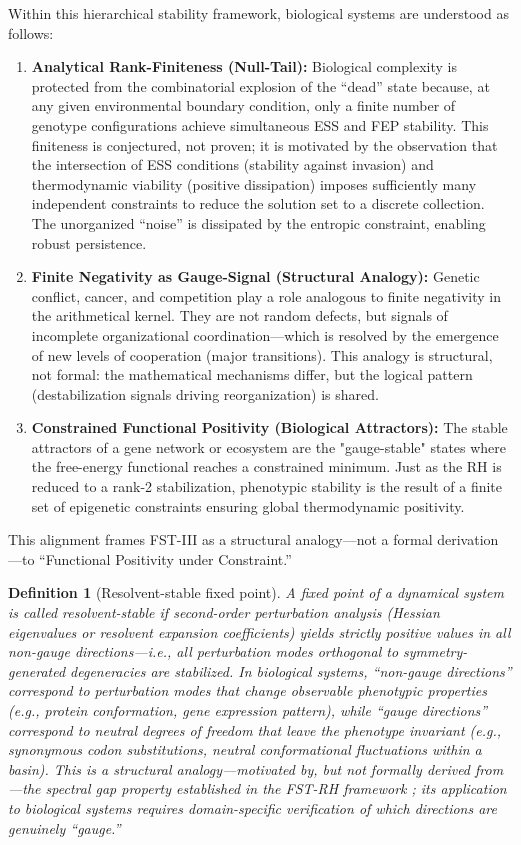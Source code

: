 \documentclass[12pt,a4paper]{article}
\newtheorem{definition}{Definition}
\theoremstyle{remark}
\begin{document}
Within this hierarchical stability framework, biological systems are understood as follows:
\begin{enumerate}[label=\alph*)]
    \item \textbf{Analytical Rank-Finiteness (Null-Tail):} Biological complexity is protected from the combinatorial explosion of the ``dead'' state because, at any given environmental boundary condition, only a finite number of genotype configurations achieve simultaneous ESS and FEP stability. This finiteness is conjectured, not proven; it is motivated by the observation that the intersection of ESS conditions (stability against invasion) and thermodynamic viability (positive dissipation) imposes sufficiently many independent constraints to reduce the solution set to a discrete collection. The unorganized ``noise'' is dissipated by the entropic constraint, enabling robust persistence.
    \item \textbf{Finite Negativity as Gauge-Signal (Structural Analogy):} Genetic conflict, cancer, and competition play a role analogous to finite negativity in the arithmetical kernel. They are not random defects, but signals of incomplete organizational coordination---which is resolved by the emergence of new levels of cooperation (major transitions). This analogy is structural, not formal: the mathematical mechanisms differ, but the logical pattern (destabilization signals driving reorganization) is shared.
    \item \textbf{Constrained Functional Positivity (Biological Attractors):} The stable attractors of a gene network or ecosystem are the "gauge-stable" states where the free-energy functional reaches a constrained minimum. Just as the RH is reduced to a rank-2 stabilization, phenotypic stability is the result of a finite set of epigenetic constraints ensuring global thermodynamic positivity.
\end{enumerate}

This alignment frames FST-III as a structural analogy---not a formal derivation---to ``Functional Positivity under Constraint.''

\begin{definition}[Resolvent-stable fixed point]
\label{def:resolvent-stable}
A fixed point of a dynamical system is called \emph{resolvent-stable} if second-order perturbation analysis (Hessian eigenvalues or resolvent expansion coefficients) yields strictly positive values in all non-gauge directions---i.e., all perturbation modes orthogonal to symmetry-generated degeneracies are stabilized. In biological systems, ``non-gauge directions'' correspond to perturbation modes that change observable phenotypic properties (e.g., protein conformation, gene expression pattern), while ``gauge directions'' correspond to neutral degrees of freedom that leave the phenotype invariant (e.g., synonymous codon substitutions, neutral conformational fluctuations within a basin). This is a structural analogy---motivated by, but not formally derived from---the spectral gap property established in the FST-RH framework \citep{GeigerRH2026b}; its application to biological systems requires domain-specific verification of which directions are genuinely ``gauge.''
\end{definition}
\end{document}
